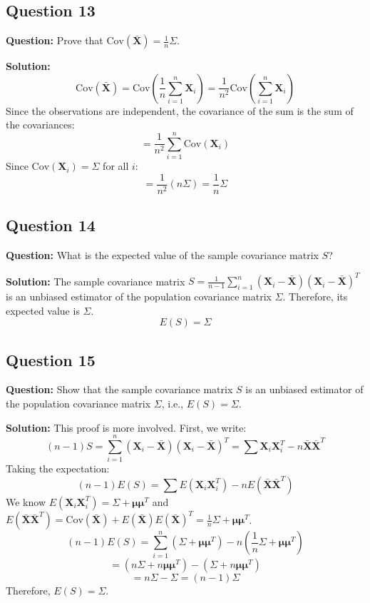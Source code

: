 \subsection*{Question 13}
\textbf{Question:} Prove that $\text{Cov}(\bar{\mathbf{X}}) = \frac{1}{n}\Sigma$.

\textbf{Solution:}
$$ \text{Cov}(\bar{\mathbf{X}}) = \text{Cov}\left(\frac{1}{n}\sum_{i=1}^n \mathbf{X}_i\right) = \frac{1}{n^2} \text{Cov}\left(\sum_{i=1}^n \mathbf{X}_i\right) $$
Since the observations are independent, the covariance of the sum is the sum of the covariances:
$$ = \frac{1}{n^2} \sum_{i=1}^n \text{Cov}(\mathbf{X}_i) $$
Since $\text{Cov}(\mathbf{X}_i) = \Sigma$ for all $i$:
$$ = \frac{1}{n^2} (n\Sigma) = \frac{1}{n}\Sigma $$

\subsection*{Question 14}
\textbf{Question:} What is the expected value of the sample covariance matrix $S$?

\textbf{Solution:}
The sample covariance matrix $S = \frac{1}{n-1} \sum_{i=1}^n (\mathbf{X}_i - \bar{\mathbf{X}})(\mathbf{X}_i - \bar{\mathbf{X}})^T$ is an unbiased estimator of the population covariance matrix $\Sigma$. Therefore, its expected value is $\Sigma$.
$$ E(S) = \Sigma $$

\subsection*{Question 15}
\textbf{Question:} Show that the sample covariance matrix $S$ is an unbiased estimator of the population covariance matrix $\Sigma$, i.e., $E(S) = \Sigma$.

\textbf{Solution:}
This proof is more involved. First, we write:
$$ (n-1)S = \sum_{i=1}^n (\mathbf{X}_i - \bar{\mathbf{X}})(\mathbf{X}_i - \bar{\mathbf{X}})^T = \sum \mathbf{X}_i\mathbf{X}_i^T - n\bar{\mathbf{X}}\bar{\mathbf{X}}^T $$
Taking the expectation:
$$ (n-1)E(S) = \sum E(\mathbf{X}_i\mathbf{X}_i^T) - nE(\bar{\mathbf{X}}\bar{\mathbf{X}}^T) $$
We know $E(\mathbf{X}_i\mathbf{X}_i^T) = \Sigma + \boldsymbol{\mu}\boldsymbol{\mu}^T$ and $E(\bar{\mathbf{X}}\bar{\mathbf{X}}^T) = \text{Cov}(\bar{\mathbf{X}}) + E(\bar{\mathbf{X}})E(\bar{\mathbf{X}})^T = \frac{1}{n}\Sigma + \boldsymbol{\mu}\boldsymbol{\mu}^T$.
$$ (n-1)E(S) = \sum_{i=1}^n (\Sigma + \boldsymbol{\mu}\boldsymbol{\mu}^T) - n(\frac{1}{n}\Sigma + \boldsymbol{\mu}\boldsymbol{\mu}^T) $$
$$ = (n\Sigma + n\boldsymbol{\mu}\boldsymbol{\mu}^T) - (\Sigma + n\boldsymbol{\mu}\boldsymbol{\mu}^T) $$
$$ = n\Sigma - \Sigma = (n-1)\Sigma $$
Therefore, $E(S) = \Sigma$.

